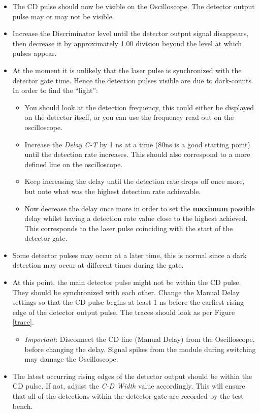 \documentclass{article}
\begin{document}
\begin{itemize}
\item
The CD pulse should now be visible on the Oscilloscope. The detector output pulse may or may not be visible.
\item
Increase the Discriminator level until the detector output signal disappears, then decrease it by approximately 1.00 division beyond the level at which pulses appear.
\item
At the moment it is unlikely that the laser pulse is synchronized with the detector gate time. Hence the detection pulses visible are due to dark-counts.  In order to find the ``light'':
\begin{itemize}
\item
You should look at the detection frequency, this could either be displayed on the detector itself, or you can use the frequency read out on the oscilloscope.
\item
Increase the \emph{Delay C-T} by 1 ns at a time (80ns is a good starting point) until the detection rate increases. This should also correspond to a more defined line on the oscilloscope.
\item
Keep increasing the delay until the detection rate drops off once more, but note what was the highest detection rate achievable. 
\item
Now decrease the delay once more in order to set the {\bf maximum} possible delay whilst having a detection rate value close to the highest achieved. This corresponds to the laser pulse coinciding with the start of the detector gate. 
\end{itemize}

\item
Some detector pulses may occur at a later time, this is normal since a dark detection may occur at different times during the gate.
\item
At this point, the main detector pulse might not be within the CD pulse. They should be synchronized with each other. Change the Manual Delay settings so that the CD pulse begins at least 1 ns before the earliest rising edge of the detector output pulse. The traces should look as per Figure \ref{trace}.
\begin{itemize}
\item
\emph{Important}: Disconnect the CD line (Manual Delay) from the Oscilloscope, before changing the delay. Signal spikes from the module during switching may damage the Oscilloscope. 
\end{itemize}

\item
The latest occurring rising edges of the detector output should be within the CD pulse. If not, adjust the \emph{C-D Width} value accordingly. This will ensure that all of the detections within the detector gate are recorded by the test bench.


\end{itemize}
\end{document}
